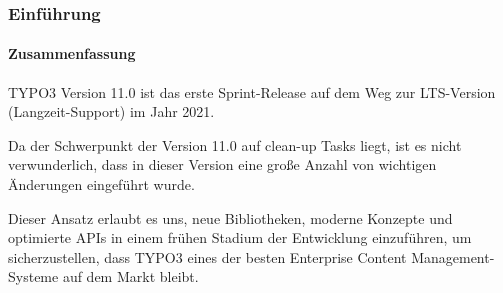 %

\begin{frame}[fragile]
	\frametitle{Einführung}
	\framesubtitle{Zusammenfassung}

	\small
		TYPO3 Version 11.0 ist das erste Sprint-Release auf dem Weg zur LTS-Version
		(Langzeit-Support) im Jahr 2021.

		\vspace{0.2cm}

		Da der Schwerpunkt der Version 11.0 auf clean-up Tasks liegt, ist es nicht verwunderlich,
		dass in dieser Version eine große Anzahl von wichtigen Änderungen eingeführt wurde.

		\vspace{0.2cm}

		Dieser Ansatz erlaubt es uns, neue Bibliotheken, moderne Konzepte und
		optimierte APIs in einem frühen Stadium der Entwicklung einzuführen, um sicherzustellen, dass TYPO3
		eines der besten Enterprise Content Management-Systeme auf dem Markt bleibt.

		\vspace{0.2cm}

	\normalsize

\end{frame}

